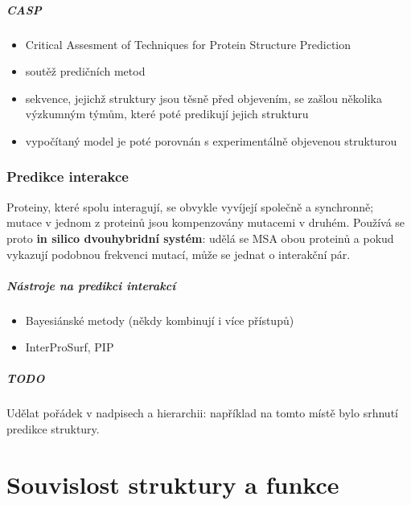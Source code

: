 \documentclass[DIV=8]{scrreprt}
\newcommand{\mybox}[2]{
    \paragraph{#1} #2
}
\begin{document}
\paragraph{CASP}
\begin{itemize}[nosep]
    \item Critical Assesment of Techniques for Protein Structure Prediction
    \item soutěž predičních metod
    \item sekvence, jejichž struktury jsou těsně před objevením, se zašlou několika výzkumným týmům, které poté predikují jejich strukturu
    \item vypočítaný model je poté porovnán s experimentálně objevenou strukturou
\end{itemize}



\subsection{Predikce interakce} \label{Predikce interakce}


Proteiny, které spolu interagují, se obvykle vyvíjejí společně a synchronně; mutace v jednom z proteinů jsou kompenzovány mutacemi v druhém. Používá se proto \textbf{in silico dvouhybridní systém}: udělá se MSA obou proteinů a pokud vykazují podobnou frekvenci mutací, může se jednat o interakční pár.

\paragraph{Nástroje na predikci interakcí}
\begin{itemize}[nosep]
    \item Bayesiánské metody (někdy kombinují i více přístupů)
    \item InterProSurf, PIP
\end{itemize}



\mybox{TODO}{Udělat pořádek v nadpisech a hierarchii: například na tomto místě bylo srhnutí predikce struktury.}


\chapter{Souvislost struktury a funkce} \label{Souvislost struktury a funkce}
\end{document}
